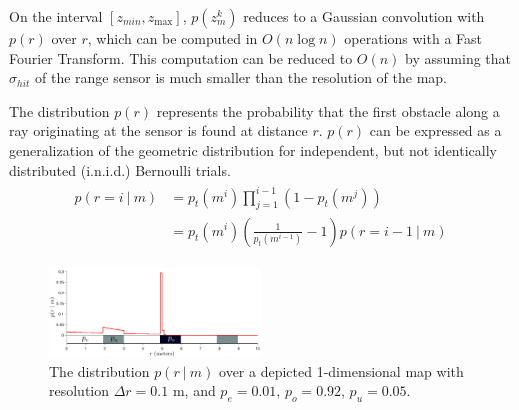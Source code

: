 \documentclass{article}
\begin{document}
On the interval $\left[z_{min}, z_{\max}\right]$, $p(z_{m}^{k})$ reduces to a Gaussian convolution with $p(r)$ over $r$, which can be computed in $O(n \log n)$ operations with a Fast Fourier Transform. This computation can be reduced to $O(n)$ by assuming that $\sigma_{hit}$ of the range sensor is much smaller than the resolution of the map.

The distribution $p(r)$ represents the probability that the first obstacle along a ray originating at the sensor is found at distance $r$. $p(r)$ can be expressed as a generalization of the geometric distribution for independent, but not identically distributed (i.n.i.d.) Bernoulli trials.
%
\begin{align}
  \begin{split}
    p(r = i
    \ \vert \
    m)
    &=
    p_{t}(m^i)
    \prod_{j=1}^{i-1}
    \left(
      1 - p_{t}(m^{j})
    \right)
    \\
    &=
    p_{t}(m^i)
    \left(
      \frac{1}{p_{t}(m^{i-1})} - 1
    \right)
    p(r = i - 1
    \ \vert \
    m)
  \end{split}
\end{align}


\begin{figure}
  \centering
  \includegraphics[width=0.5\textwidth]{meas_model.pdf}
  \caption{The distribution $p(r \ \vert \ m)$ over a depicted 1-dimensional map with resolution $\Delta r = 0.1$ m, and $p_{e} = 0.01$, $p_{o} = 0.92$, $p_{u} = 0.05$. \label{fig:measurement_model}}
\end{figure}
\end{document}
